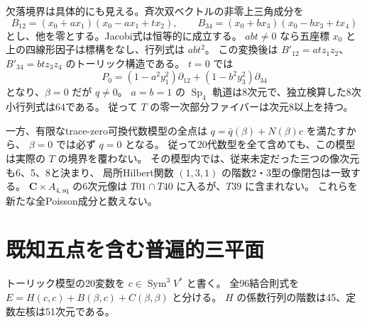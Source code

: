 \documentclass[11pt,a4paper]{ltjsarticle}
\newcommand{\CC}{\mathbf C}
\DeclareMathOperator{\Sp}{Sp}
\theoremstyle{remark}
\begin{document}
欠落境界は具体的にも見える。斉次双ベクトルの非零上三角成分を
\[
 B_{12}=(x_0+ax_1)(x_0-ax_1+tx_2),\qquad
 B_{34}=(x_0+bx_3)(x_0-bx_3+tx_4)
\]
とし、他を零とする。Jacobi式は恒等的に成立する。
$abt\ne0$ なら五座標 $x_0$ と上の四線形因子は標構をなし、行列式は $abt^2$。
この変換後は $B'_{12}=at z_1z_2$、$B'_{34}=bt z_3z_4$ のトーリック構造である。
$t=0$ では
\[
 P_0=(1-a^2y_1^2)\partial_{12}+(1-b^2y_3^2)\partial_{34}
\]
となり、$\beta=0$ だが $q\ne0$。
$a=b=1$ の $\Sp_4$ 軌道は8次元で、独立検算した8次小行列式は64である。
従って $T$ の零一次部分ファイバーは次元8以上を持つ\cite{toric-boundary-new}。

一方、有限なtrace-zero可換代数模型の全点は $q=\bar q(\beta)+N(\beta)c$ を満たすから、
$\beta=0$ では必ず $q=0$ となる。
従って20代数型を全て含めても、この模型は実際の $T$ の境界を覆わない。
その模型内では、従来未定だった三つの像次元も6、5、8と決まり、
局所Hilbert関数 $(1,3,1)$ の階数2・3型の像閉包は一致する。
$\CC\times A_{4,\mathrm{sq}}$ の6次元像は $T01\cap T40$ に入るが、$T39$ に含まれない。
これらを新たな全Poisson成分と数えない。

\section{既知五点を含む普遍的三平面}\label{sec:five-plane}
トーリック模型の20変数を $c\in\operatorname{Sym}^3V^*$ と書く。
全96結合則式を $E=H(c,c)+B(\beta,c)+C(\beta,\beta)$ と分ける。
$H$ の係数行列の階数は45、定数左核は51次元である。
\end{document}
